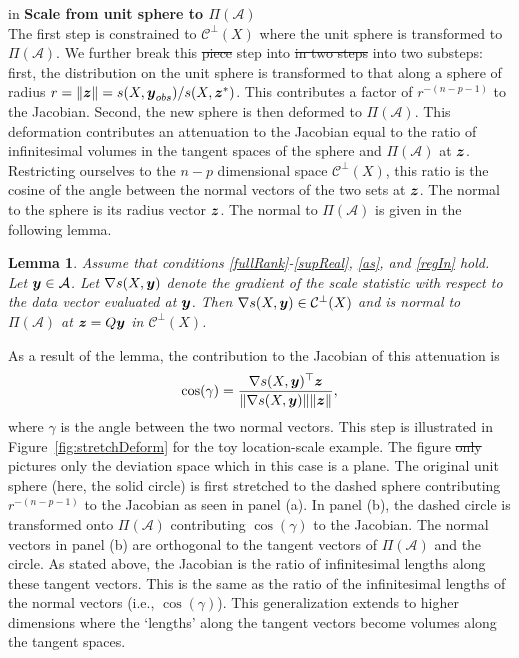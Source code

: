\documentclass[12pt]{article}
\newcommand{\by}{\mbox{\boldmath $y$}}
\newcommand{\bz}{\mbox{\boldmath $z$}}
\newcommand{\mc}{\mathcal}
\newtheorem{lemma}[theorem]{\bf Lemma}
\newcommand{\green}[1]{{\color{green}#1}}
\begin{document}
 in
\noindent
{\bf Scale from unit sphere to $\Pi(\mathcal{A})$} \\
The first step is constrained to $\mc{C}^\perp(X)$ where the unit sphere is transformed to $\Pi(\mathcal{A})$. We further break this \green{\sout{piece} step into \sout{in two steps} into two substeps}: first, the distribution on the unit sphere is transformed to that along a sphere of radius $r=\|\bz\|={s(X,\boldsymbol{y}_{obs})}/{s(X, \boldsymbol{z}^{*})}$. This contributes \green{a factor of} $r^{-(n-p-1)}$ to the Jacobian. Second, the new sphere is then deformed to $\Pi(\mathcal{A})$.  This deformation contributes an attenuation to the Jacobian equal to the
ratio of infinitesimal volumes in the
tangent spaces of the sphere and $\Pi(\mathcal{A})$ at $\bz$.  
Restricting ourselves to the $n-p$ dimensional space $\mc{C}^\perp(X)$, this
ratio is the cosine of the angle between the normal 
vectors of the two sets at $\bz$.  The normal to the sphere is its radius vector $\bz$. The normal to
$\Pi(\mathcal{A})$ is given in the following lemma.  

\begin{lemma}
\label{gradSTheoremReg}
Assume that conditions \ref{fullRank}-\ref{supReal}, \ref{as}, and \ref{regIn} hold.  
Let $\by\in \mathcal{A}$. Let 
$\nabla s(X,\by)$ denote the
gradient of the scale statistic with respect to the data vector evaluated at
$\by$.  Then $\nabla s(X,\by)\in \mc{C}^\perp(X)$ and is 
normal to $\Pi(\mathcal{A})$ at $\bz=Q\by$  in $\mc{C}^\perp(X)$.
\end{lemma}

As a result of the lemma, the contribution to the  Jacobian of this attenuation is 
\begin{equation}
\label{cosine}
\cos(\gamma)=\frac{\nabla s(X,\by)^\top \bz}{\|\nabla
s(X,\by)\| \|\bz\|},
\end{equation}
where $\gamma$ is the angle between the two normal vectors.
This step is illustrated in Figure~\ref{fig:stretchDeform} for the toy
location-scale example.  The figure \green{\sout{only}} pictures \green{only} the deviation space
which in this case is a plane. The original unit  sphere (here, the
solid circle) is first stretched to the dashed sphere contributing
$r^{-(n-p-1)}$ to the Jacobian as seen in panel (a). In panel (b), the
dashed circle is transformed onto $\Pi(\mc A)$ contributing
$\cos(\gamma)$ to the Jacobian. The normal vectors in panel (b) are
orthogonal to the tangent vectors of $\Pi(\mc A)$ and the circle. As
stated above, the Jacobian is the ratio of infinitesimal lengths along these tangent vectors. This is the same as the ratio of the infinitesimal lengths of the normal vectors (i.e., $\cos(\gamma)$). This generalization extends to higher dimensions where the `lengths' along the tangent vectors become volumes along the tangent spaces. 
\end{document}
